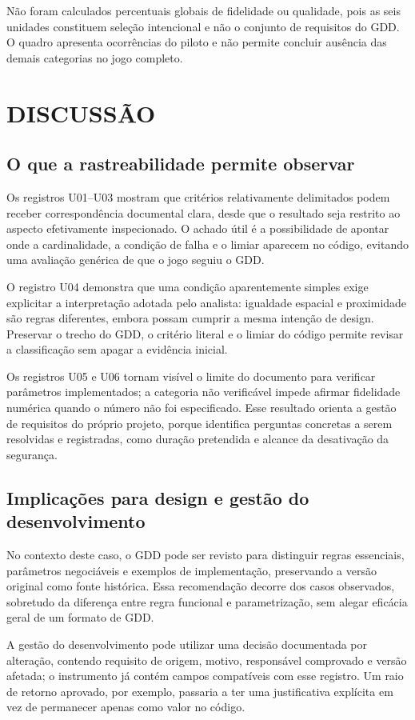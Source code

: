 Não foram calculados percentuais globais de fidelidade ou qualidade, pois as seis unidades constituem seleção intencional e não o conjunto de requisitos do GDD. O quadro apresenta ocorrências do piloto e não permite concluir ausência das demais categorias no jogo completo.

\section{DISCUSSÃO}
\subsection{O que a rastreabilidade permite observar}
Os registros U01--U03 mostram que critérios relativamente delimitados podem receber correspondência documental clara, desde que o resultado seja restrito ao aspecto efetivamente inspecionado. O achado útil é a possibilidade de apontar onde a cardinalidade, a condição de falha e o limiar aparecem no código, evitando uma avaliação genérica de que o jogo seguiu o GDD.

O registro U04 demonstra que uma condição aparentemente simples exige explicitar a interpretação adotada pelo analista: igualdade espacial e proximidade são regras diferentes, embora possam cumprir a mesma intenção de design. Preservar o trecho do GDD, o critério literal e o limiar do código permite revisar a classificação sem apagar a evidência inicial.

Os registros U05 e U06 tornam visível o limite do documento para verificar parâmetros implementados; a categoria não verificável impede afirmar fidelidade numérica quando o número não foi especificado. Esse resultado orienta a gestão de requisitos do próprio projeto, porque identifica perguntas concretas a serem resolvidas e registradas, como duração pretendida e alcance da desativação da segurança.

\subsection{Implicações para design e gestão do desenvolvimento}
No contexto deste caso, o GDD pode ser revisto para distinguir regras essenciais, parâmetros negociáveis e exemplos de implementação, preservando a versão original como fonte histórica. Essa recomendação decorre dos casos observados, sobretudo da diferença entre regra funcional e parametrização, sem alegar eficácia geral de um formato de GDD.

A gestão do desenvolvimento pode utilizar uma decisão documentada por alteração, contendo requisito de origem, motivo, responsável comprovado e versão afetada; o instrumento já contém campos compatíveis com esse registro. Um raio de retorno aprovado, por exemplo, passaria a ter uma justificativa explícita em vez de permanecer apenas como valor no código.

